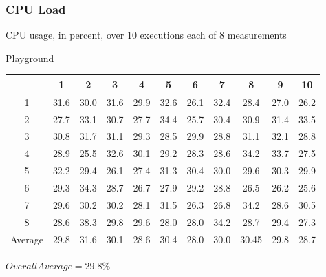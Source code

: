 \subsubsection{CPU Load}
\begin{center}
    CPU usage, in percent, over 10 executions each of 8 measurements

    Playground\\
    \begin{tabular}{ |c|c|c|c|c|c|c|c|c|c|c| }
        \hline
          & 1 & 2 & 3 & 4 & 5 & 6 & 7 & 8 & 9 & 10 \\
        \hline
        \hline
        1 & 31.6 & 30.0 & 31.6 & 29.9 & 32.6 & 26.1 & 32.4 & 28.4 & 27.0 & 26.2 \\
        2 & 27.7 & 33.1 & 30.7 & 27.7 & 34.4 & 25.7 & 30.4 & 30.9 & 31.4 & 33.5 \\
        3 & 30.8 & 31.7 & 31.1 & 29.3 & 28.5 & 29.9 & 28.8 & 31.1 & 32.1 & 28.8 \\
        4 & 28.9 & 25.5 & 32.6 & 30.1 & 29.2 & 28.3 & 28.6 & 34.2 & 33.7 & 27.5 \\
        5 & 32.2 & 29.4 & 26.1 & 27.4 & 31.3 & 30.4 & 30.0 & 29.6 & 30.3 & 29.9 \\
        6 & 29.3 & 34.3 & 28.7 & 26.7 & 27.9 & 29.2 & 28.8 & 26.5 & 26.2 & 25.6 \\
        7 & 29.6 & 30.2 & 30.2 & 28.1 & 31.5 & 26.3 & 26.8 & 34.2 & 28.6 & 30.5 \\
        8 & 28.6 & 38.3 & 29.8 & 29.6 & 28.0 & 28.0 & 34.2 & 28.7 & 29.4 & 27.3 \\
        \hline
        \hline
        Average & 29.8 & 31.6 & 30.1 & 28.6 & 30.4 & 28.0 & 30.0 & 30.45 & 29.8 & 28.7 \\
        \hline
    \end{tabular}
    $ Overall Average = 29.8\% $


\end{center}
